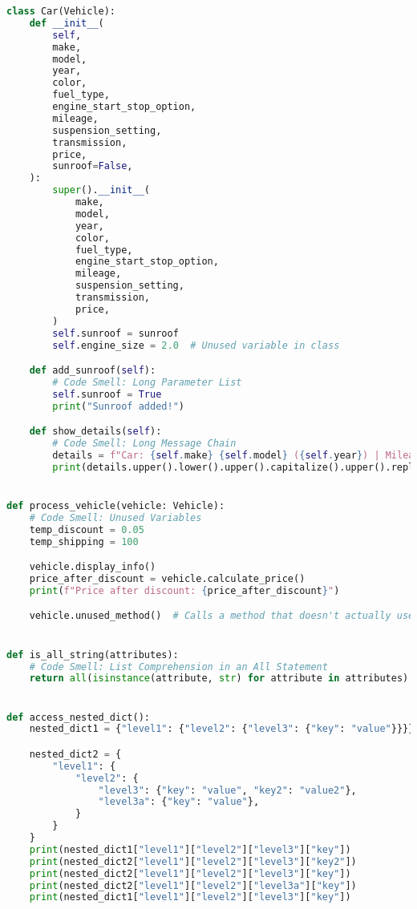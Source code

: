 \documentclass{article}
\begin{document}
\begin{lstlisting}[language=Python,caption={Complex Class Structures (sample.py)},label=lst:task7]
class Car(Vehicle):
    def __init__(
        self,
        make,
        model,
        year,
        color,
        fuel_type,
        engine_start_stop_option,
        mileage,
        suspension_setting,
        transmission,
        price,
        sunroof=False,
    ):
        super().__init__(
            make,
            model,
            year,
            color,
            fuel_type,
            engine_start_stop_option,
            mileage,
            suspension_setting,
            transmission,
            price,
        )
        self.sunroof = sunroof
        self.engine_size = 2.0  # Unused variable in class

    def add_sunroof(self):
        # Code Smell: Long Parameter List
        self.sunroof = True
        print("Sunroof added!")

    def show_details(self):
        # Code Smell: Long Message Chain
        details = f"Car: {self.make} {self.model} ({self.year}) | Mileage: {self.mileage} | Transmission: {self.transmission} | Sunroof: {self.sunroof} | Engine Start Option: {self.engine_start_stop_option} | Suspension Setting: {self.suspension_setting} | Seat Position {self.seat_position_setting}"
        print(details.upper().lower().upper().capitalize().upper().replace("|", "-"))


def process_vehicle(vehicle: Vehicle):
    # Code Smell: Unused Variables
    temp_discount = 0.05
    temp_shipping = 100

    vehicle.display_info()
    price_after_discount = vehicle.calculate_price()
    print(f"Price after discount: {price_after_discount}")

    vehicle.unused_method()  # Calls a method that doesn't actually use the class attributes


def is_all_string(attributes):
    # Code Smell: List Comprehension in an All Statement
    return all(isinstance(attribute, str) for attribute in attributes)


def access_nested_dict():
    nested_dict1 = {"level1": {"level2": {"level3": {"key": "value"}}}}

    nested_dict2 = {
        "level1": {
            "level2": {
                "level3": {"key": "value", "key2": "value2"},
                "level3a": {"key": "value"},
            }
        }
    }
    print(nested_dict1["level1"]["level2"]["level3"]["key"])
    print(nested_dict2["level1"]["level2"]["level3"]["key2"])
    print(nested_dict2["level1"]["level2"]["level3"]["key"])
    print(nested_dict2["level1"]["level2"]["level3a"]["key"])
    print(nested_dict1["level1"]["level2"]["level3"]["key"])



\end{lstlisting}
\end{document}
